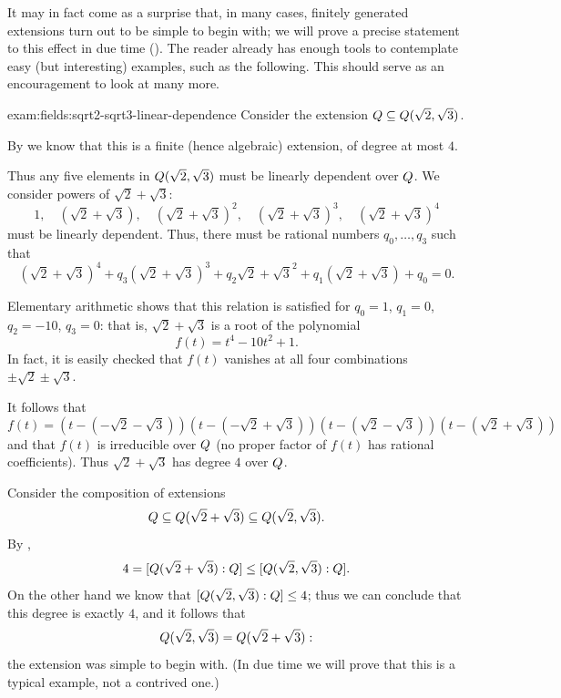 It may in fact come as a surprise that, in many cases, finitely
generated extensions turn out to be simple to begin with; we will
prove a precise statement to this effect in due time
(). The reader already has enough tools to
contemplate easy (but interesting) examples, such as the
following. This should serve as an encouragement to look at many more.
\begin{exam}{}{exam:fields:sqrt2-sqrt3-linear-dependence}
  Consider the extension $Q \subseteq Q(\sqrt{2}, \sqrt{3})$.

  By  we know that this is a finite (hence
  algebraic) extension, of degree at most $4$.

  Thus any five elements in $Q(\sqrt{2}, \sqrt{3})$ must be linearly
  dependent over $Q$. We consider powers of $\sqrt{2} + \sqrt{3}$:
  \[
    1,\quad (\sqrt{2}+\sqrt{3}),\quad {(\sqrt{2}+\sqrt{3})}^2,\quad
    {(\sqrt{2}+\sqrt{3})}^3,\quad {(\sqrt{2}+\sqrt{3})}^4
  \]
  must be linearly dependent. Thus, there must be rational numbers
  $q_0, \dots, q_3$ such that
  \[ {(\sqrt{2}+\sqrt{3})}^4 + q_3{(\sqrt{2}+\sqrt{3})}^3 +
    q_2{\sqrt{2}+\sqrt{3}}^2 + q_1(\sqrt{2}+\sqrt{3}) + q_0 = 0.
  \]

  Elementary arithmetic shows that this relation is satisfied for
  $q_0 = 1$, $q_1 = 0$, $q_2 = -10$, $q_3 = 0$: that is,
  $\sqrt{2}+\sqrt{3}$ is a root of the polynomial
  \[
    f(t) = t^4 - 10t^2 + 1.
  \]
  In fact, it is easily checked that $f(t)$ vanishes at all four
  combinations $\pm\sqrt{2} \pm \sqrt{3}$.

  It follows that
  \[
    f(t) = (t-(-\sqrt{2}-\sqrt{3}))(t-(-\sqrt{2}+\sqrt{3}))
    (t-(\sqrt{2}-\sqrt{3}))(t-(\sqrt{2}+\sqrt{3}))
  \]
  and that $f(t)$ is irreducible over $Q$ (no proper factor of $f(t)$
  has rational coefficients). Thus $\sqrt{2}+\sqrt{3}$ has degree $4$
  over $Q$.

  Consider the composition of extensions
  \[
    Q \subseteq Q(\sqrt{2}+\sqrt{3}) \subseteq
    Q(\sqrt{2},\sqrt{3}).
  \]
  By ,
  \[
    4 = [Q(\sqrt{2}+\sqrt{3}) : Q] \leq [Q(\sqrt{2},\sqrt{3}) :
    Q].
  \]
  On the other hand we know that
  $[Q(\sqrt{2},\sqrt{3}) : Q] \leq 4$; thus we can conclude that
  this degree is exactly $4$, and it follows that
  \[
    Q(\sqrt{2},\sqrt{3}) = Q(\sqrt{2}+\sqrt{3}):
  \]
  the extension was simple to begin with. (In due time we will prove
  that this is a typical example, not a contrived one.)


\end{exam}
